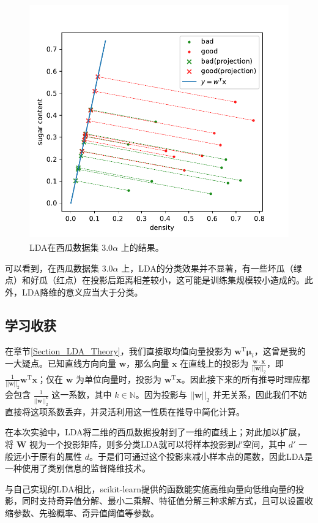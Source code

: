\documentclass{ctexart}
\begin{document}
	\begin{figure}[htb]
		\centering
		\includegraphics[scale=1,height=10.2cm]{../image/3.5my.pdf}
		\caption{LDA在西瓜数据集 $3.0\alpha$ 上的结果。}
		\label{LDA_RES}
	\end{figure}
	
	可以看到，在西瓜数据集 $3.0\alpha$ 上，LDA的分类效果并不显著，有一些坏瓜（绿点）和好瓜（红点）在投影后距离相差较小，这可能是训练集规模较小造成的。此外，LDA降维的意义应当大于分类。
	
	\subsection{学习收获}
	
	在章节\ref{Section_LDA_Theory}，我们直接取均值向量投影为 $\bm{w}^\mathrm{T}\bm{\mu}_i$，这曾是我的一大疑点。已知直线方向向量 $\bm{w}$，那么向量 $\bm{x}$ 在直线上的投影为 $\frac{\bm{w}\cdot\bm{x}}{||\bm{w}||_2}$，即 $\frac{1}{||\bm{w}||_2}\bm{w}^\mathrm{T}\bm{x}$；仅在 $\bm{w}$ 为单位向量时，投影为 $\bm{w}^\mathrm{T}\bm{x}$。因此接下来的所有推导时理应都会包含 $\frac{1}{||\bm{w}||_2^k}$ 这一系数，其中 $k\in \mathbb{N}$。因为投影与 $||\bm{w}||_2$ 并无关系，因此我们不妨直接将这项系数丢弃，并灵活利用这一性质在推导中简化计算。
	
	在本次实验中，LDA将二维的西瓜数据投射到了一维的直线上；对此加以扩展，将 $\bm{W}$ 视为一个投影矩阵，则多分类LDA就可以将样本投影到$d'$空间，其中 $d'$ 一般远小于原有的属性 $d$。于是们可通过这个投影来减小样本点的尾数，因此LDA是一种使用了类别信息的监督降维技术。
	
	与自己实现的LDA相比，scikit-learn提供的函数能实施高维向量向低维向量的投影，同时支持奇异值分解、最小二乘解、特征值分解三种求解方式，且可以设置收缩参数、先验概率、奇异值阈值等参数。
	
\end{document}
